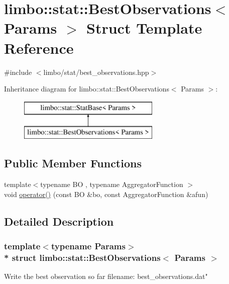 \hypertarget{structlimbo_1_1stat_1_1_best_observations}{}\section{limbo\+:\+:stat\+:\+:Best\+Observations$<$ Params $>$ Struct Template Reference}
\label{structlimbo_1_1stat_1_1_best_observations}


{\ttfamily \#include $<$limbo/stat/best\+\_\+observations.\+hpp$>$}

Inheritance diagram for limbo\+:\+:stat\+:\+:Best\+Observations$<$ Params $>$\+:\begin{figure}[H]
\begin{center}
\leavevmode
\includegraphics[height=2.000000cm]{structlimbo_1_1stat_1_1_best_observations}
\end{center}
\end{figure}
\subsection*{Public Member Functions}
\begin{DoxyCompactItemize}
\item 
{\footnotesize template$<$typename BO , typename Aggregator\+Function $>$ }\\void \hyperlink{structlimbo_1_1stat_1_1_best_observations_aab6d5545f02eca0fd147c79b64f4a3f9}{operator()} (const BO \&bo, const Aggregator\+Function \&afun)
\end{DoxyCompactItemize}


\subsection{Detailed Description}
\subsubsection*{template$<$typename Params$>$\\*
struct limbo\+::stat\+::\+Best\+Observations$<$ Params $>$}

Write the best observation so far filename\+: {\ttfamily best\+\_\+observations.\+dat"} 

